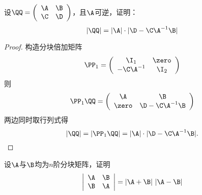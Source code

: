 \begin{frame}\ft{\secname}

  \begin{li}
    设$\QQ=\left(
      \begin{array}{cc}
        \A&\B\\
        \C&\D
      \end{array}
    \right)$，且$\A$可逆，证明：
    $$
    |\QQ| = |\A| \cdot |\D-\C\A^{-1}\B|
    $$
  \end{li}\pause
\begin{proof}
  构造分块倍加矩阵
  $$
  \PP_1 = \left(
    \begin{array}{cc}
      \I_1 & \zero\\
      -\C\A^{-1} & \I_2
    \end{array}
  \right)
  $$ \pause
  则
  $$
  \PP_1 \QQ = \left(
    \begin{array}{cc}
      \A & \B\\
      \zero & \D-\C\A^{-1}\B
    \end{array}
  \right)
  $$
\pause
  两边同时取行列式得
  $$
  |\QQ| = |\PP_1\QQ| = |\A|\cdot |\D-\C\A^{-1}\B|.
  $$
\end{proof}
\end{frame}

\begin{frame}\ft{\secname}
  \begin{li}
    设$\A$与$\B$均为$n$阶分块矩阵，证明
    $$
    \left|
      \begin{array}{cc}
        \A&\B\\
        \B&\A
      \end{array}
    \right| = |\A+\B|~|\A-\B|
    $$
  \end{li}
\end{frame}

